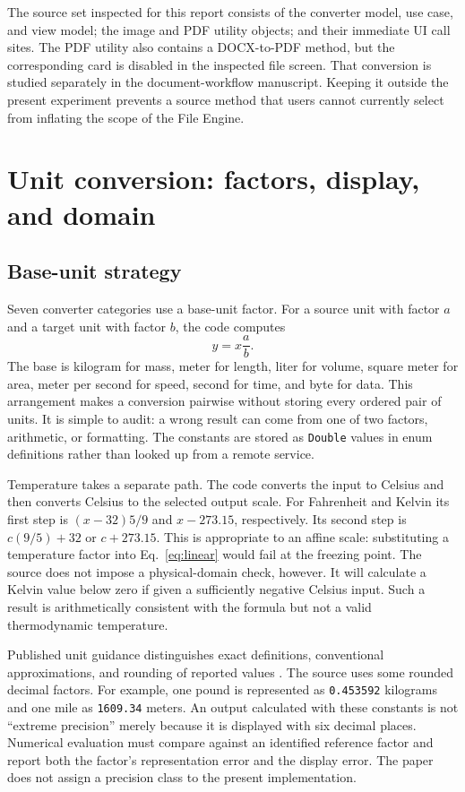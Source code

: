 \documentclass[10pt,letterpaper]{article}
\begin{document}
The source set inspected for this report consists of the converter model, use case, and view model; the image and PDF utility objects; and their immediate UI call sites. The PDF utility also contains a DOCX-to-PDF method, but the corresponding card is disabled in the inspected file screen. That conversion is studied separately in the document-workflow manuscript. Keeping it outside the present experiment prevents a source method that users cannot currently select from inflating the scope of the File Engine.

\section{Unit conversion: factors, display, and domain}

\subsection{Base-unit strategy}

Seven converter categories use a base-unit factor. For a source unit with factor $a$ and a target unit with factor $b$, the code computes
\begin{equation}
y=x\frac{a}{b}.
\label{eq:linear}
\end{equation}
The base is kilogram for mass, meter for length, liter for volume, square meter for area, meter per second for speed, second for time, and byte for data. This arrangement makes a conversion pairwise without storing every ordered pair of units. It is simple to audit: a wrong result can come from one of two factors, arithmetic, or formatting. The constants are stored as \texttt{Double} values in enum definitions rather than looked up from a remote service.

Temperature takes a separate path. The code converts the input to Celsius and then converts Celsius to the selected output scale. For Fahrenheit and Kelvin its first step is $(x-32)5/9$ and $x-273.15$, respectively. Its second step is $c(9/5)+32$ or $c+273.15$. This is appropriate to an affine scale: substituting a temperature factor into Eq.~\ref{eq:linear} would fail at the freezing point. The source does not impose a physical-domain check, however. It will calculate a Kelvin value below zero if given a sufficiently negative Celsius input. Such a result is arithmetically consistent with the formula but not a valid thermodynamic temperature.

Published unit guidance distinguishes exact definitions, conventional approximations, and rounding of reported values \cite{nist}. The source uses some rounded decimal factors. For example, one pound is represented as \texttt{0.453592} kilograms and one mile as \texttt{1609.34} meters. An output calculated with these constants is not ``extreme precision'' merely because it is displayed with six decimal places. Numerical evaluation must compare against an identified reference factor and report both the factor's representation error and the display error. The paper does not assign a precision class to the present implementation.
\end{document}
